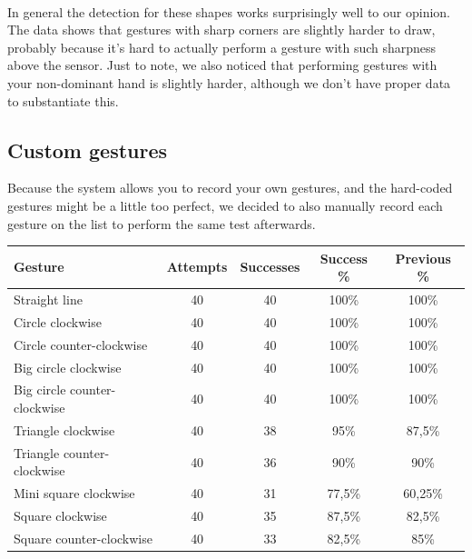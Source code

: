 \documentclass[a4paper]{article}
\begin{document}
  \paragraph{}
  In general the detection for these shapes works surprisingly well to our
  opinion. The data shows that gestures with sharp corners are slightly harder
  to draw, probably because it's hard to actually perform a gesture with such
  sharpness above the sensor. Just to note, we also noticed that performing
  gestures with your non-dominant hand is slightly harder, although we don't
  have proper data to substantiate this.

  \subsection{Custom gestures}
  Because the system allows you to record your own gestures, and the hard-coded
  gestures might be a little too perfect, we decided to also manually record
  each gesture on the list to perform the same test afterwards.

  \begin{center}
    \begin{tabular}{ |l|c|c|c|c| }
      \hline
      \textbf{Gesture} & \textbf{Attempts} &
    \textbf{Successes} & \textbf{Success \%} & \textbf{Previous \%} \\
      \hline
      Straight line & 40 & 40 & 100\% & 100\% \\
      \hline
      Circle clockwise & 40 & 40 & 100\% & 100\% \\
      \hline
      Circle counter-clockwise & 40 & 40 & 100\% & 100\% \\
      \hline
      Big circle clockwise & 40 & 40 & 100\% & 100\% \\
      \hline
      Big circle counter-clockwise & 40 & 40 & 100\% & 100\% \\
      \hline
      Triangle clockwise & 40 & 38 & 95\% & 87,5\% \\
      \hline
      Triangle counter-clockwise & 40 & 36 & 90\% & 90\% \\
      \hline
      Mini square clockwise & 40 & 31 & 77,5\% & 60,25\% \\
      \hline
      Square clockwise & 40 & 35 & 87,5\% & 82,5\% \\
      \hline
      Square counter-clockwise & 40 & 33 & 82,5\% & 85\% \\
      \hline
    \end{tabular}
  \end{center}
\end{document}
